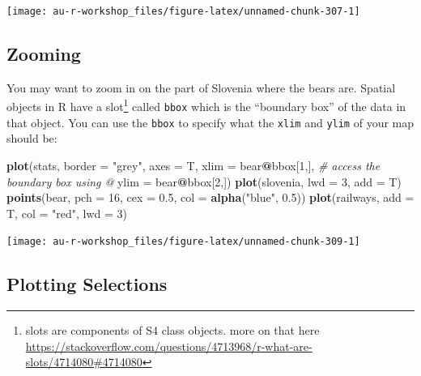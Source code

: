 \documentclass[]{book}
\newenvironment{Shaded}{\begin{snugshade}}{\end{snugshade}}
\newcommand{\KeywordTok}[1]{\textcolor[rgb]{0.13,0.29,0.53}{\textbf{#1}}}
\newcommand{\DataTypeTok}[1]{\textcolor[rgb]{0.13,0.29,0.53}{#1}}
\newcommand{\DecValTok}[1]{\textcolor[rgb]{0.00,0.00,0.81}{#1}}
\newcommand{\FloatTok}[1]{\textcolor[rgb]{0.00,0.00,0.81}{#1}}
\newcommand{\StringTok}[1]{\textcolor[rgb]{0.31,0.60,0.02}{#1}}
\newcommand{\CommentTok}[1]{\textcolor[rgb]{0.56,0.35,0.01}{\textit{#1}}}
\newcommand{\OperatorTok}[1]{\textcolor[rgb]{0.81,0.36,0.00}{\textbf{#1}}}
\newcommand{\NormalTok}[1]{#1}
\let\rmarkdownfootnote\footnote%
\def\footnote{\protect\rmarkdownfootnote}
\theoremstyle{definition}
\theoremstyle{definition}
\theoremstyle{definition}
\theoremstyle{remark}
\begin{document}
\begin{center}\texttt{[image: au-r-workshop\_files/figure-latex/unnamed-chunk-307-1]} \end{center}

\subsection{Zooming}\label{zoom}

You may want to zoom in on the part of Slovenia where the bears are.
Spatial objects in R have a slot\footnote{slots are components of S4
  class objects. more on that here
  \url{https://stackoverflow.com/questions/4713968/r-what-are-slots/4714080\#4714080}}
called \texttt{bbox} which is the ``boundary box'' of the data in that
object. You can use the \texttt{bbox} to specify what the \texttt{xlim}
and \texttt{ylim} of your map should be:

\begin{Shaded}
\begin{Highlighting}[]
\KeywordTok{plot}\NormalTok{(stats, }\DataTypeTok{border =} \StringTok{"grey"}\NormalTok{, }\DataTypeTok{axes =}\NormalTok{ T,}
     \DataTypeTok{xlim =}\NormalTok{ bear}\OperatorTok{@}\NormalTok{bbox[}\DecValTok{1}\NormalTok{,],  }\CommentTok{# access the boundary box using @}
     \DataTypeTok{ylim =}\NormalTok{ bear}\OperatorTok{@}\NormalTok{bbox[}\DecValTok{2}\NormalTok{,])}
\KeywordTok{plot}\NormalTok{(slovenia, }\DataTypeTok{lwd =} \DecValTok{3}\NormalTok{, }\DataTypeTok{add =}\NormalTok{ T)}
\KeywordTok{points}\NormalTok{(bear, }\DataTypeTok{pch =} \DecValTok{16}\NormalTok{, }\DataTypeTok{cex =} \FloatTok{0.5}\NormalTok{, }\DataTypeTok{col =} \KeywordTok{alpha}\NormalTok{(}\StringTok{"blue"}\NormalTok{, }\FloatTok{0.5}\NormalTok{))}
\KeywordTok{plot}\NormalTok{(railways, }\DataTypeTok{add =}\NormalTok{ T, }\DataTypeTok{col =} \StringTok{"red"}\NormalTok{, }\DataTypeTok{lwd =} \DecValTok{3}\NormalTok{)}
\end{Highlighting}
\end{Shaded}

\begin{center}\texttt{[image: au-r-workshop\_files/figure-latex/unnamed-chunk-309-1]} \end{center}

\subsection{Plotting Selections}\label{plot-selections}
\end{document}
